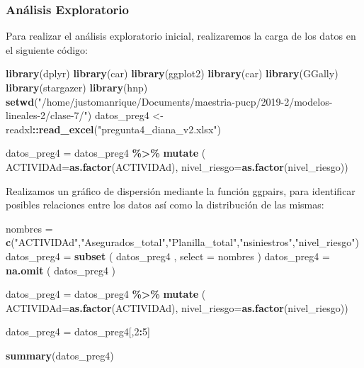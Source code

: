\documentclass[]{article}
\newenvironment{Shaded}{\begin{snugshade}}{\end{snugshade}}
\newcommand{\DataTypeTok}[1]{\textcolor[rgb]{0.13,0.29,0.53}{#1}}
\newcommand{\DecValTok}[1]{\textcolor[rgb]{0.00,0.00,0.81}{#1}}
\newcommand{\KeywordTok}[1]{\textcolor[rgb]{0.13,0.29,0.53}{\textbf{#1}}}
\newcommand{\NormalTok}[1]{#1}
\newcommand{\OperatorTok}[1]{\textcolor[rgb]{0.81,0.36,0.00}{\textbf{#1}}}
\newcommand{\StringTok}[1]{\textcolor[rgb]{0.31,0.60,0.02}{#1}}
\begin{document}
\hypertarget{anuxe1lisis-exploratorio}{%
\subsubsection{Análisis Exploratorio}\label{anuxe1lisis-exploratorio}}

Para realizar el análisis exploratorio inicial, realizaremos la carga de
los datos en el siguiente código:

\begin{Shaded}
\begin{Highlighting}[]
\KeywordTok{library}\NormalTok{(dplyr)}
\KeywordTok{library}\NormalTok{(car)}
\KeywordTok{library}\NormalTok{(ggplot2)}
\KeywordTok{library}\NormalTok{(car)}
\KeywordTok{library}\NormalTok{(GGally)}
\KeywordTok{library}\NormalTok{(stargazer)}
\KeywordTok{library}\NormalTok{(hnp)}
\KeywordTok{setwd}\NormalTok{(}\StringTok{"/home/justomanrique/Documents/maestria{-}pucp/2019{-}2/modelos{-}lineales{-}2/clase{-}7/"}\NormalTok{)}
\NormalTok{datos\_preg4 <{-}}\StringTok{ }\NormalTok{readxl}\OperatorTok{::}\KeywordTok{read\_excel}\NormalTok{(}\StringTok{"pregunta4\_diana\_v2.xlsx"}\NormalTok{)}

\NormalTok{datos\_preg4 =}\StringTok{ }\NormalTok{datos\_preg4 }\OperatorTok{\%>\%}
\StringTok{  }\KeywordTok{mutate}\NormalTok{ (  }\DataTypeTok{ACTIVIDAd=}\KeywordTok{as.factor}\NormalTok{(ACTIVIDAd),}
            \DataTypeTok{nivel\_riesgo=}\KeywordTok{as.factor}\NormalTok{(nivel\_riesgo))}
\end{Highlighting}
\end{Shaded}

Realizamos un gráfico de dispersión mediante la función ggpairs, para
identificar posibles relaciones entre los datos así como la distribución
de las mismas:

\begin{Shaded}
\begin{Highlighting}[]
\NormalTok{nombres =}\StringTok{ }\KeywordTok{c}\NormalTok{(}\StringTok{"ACTIVIDAd"}\NormalTok{,}\StringTok{"Asegurados\_total"}\NormalTok{,}\StringTok{"Planilla\_total"}\NormalTok{,}\StringTok{"nsiniestros"}\NormalTok{,}\StringTok{"nivel\_riesgo"}\NormalTok{)}
\NormalTok{datos\_preg4 =}\StringTok{ }\KeywordTok{subset}\NormalTok{ ( datos\_preg4 , }\DataTypeTok{select =}\NormalTok{ nombres )}
\NormalTok{datos\_preg4 =}\StringTok{ }\KeywordTok{na.omit}\NormalTok{ ( datos\_preg4 )}

\NormalTok{datos\_preg4 =}\StringTok{ }\NormalTok{datos\_preg4 }\OperatorTok{\%>\%}
\StringTok{  }\KeywordTok{mutate}\NormalTok{ (  }\DataTypeTok{ACTIVIDAd=}\KeywordTok{as.factor}\NormalTok{(ACTIVIDAd),}
            \DataTypeTok{nivel\_riesgo=}\KeywordTok{as.factor}\NormalTok{(nivel\_riesgo))}

\NormalTok{datos\_preg4 =}\StringTok{ }\NormalTok{datos\_preg4[,}\DecValTok{2}\OperatorTok{:}\DecValTok{5}\NormalTok{]}

\KeywordTok{summary}\NormalTok{(datos\_preg4)}
\end{Highlighting}
\end{Shaded}
\end{document}
